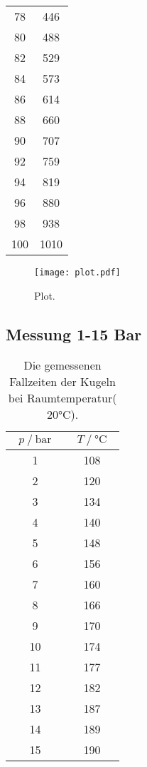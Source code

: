 \begin{table}
\begin{tabular}{cc}
      78 & 446 \\
      80 & 488 \\
      82 & 529 \\
      84 & 573 \\
      86 & 614 \\
      88 & 660 \\
      90 & 707 \\
      92 & 759 \\
      94 & 819 \\
      96 & 880 \\
      98 & 938 \\
      100 & 1010 \\
    \bottomrule
  \end{tabular}
  \label{tab:Tabelle1}
\end{table}
\begin{figure}[H]
  \centering
  \texttt{[image: plot.pdf]}
  \caption{Plot.}
  \label{fig:plot}
\end{figure}
\subsection{Messung 1-15 Bar}
\begin{table}
  \centering
  \caption{Die gemessenen Fallzeiten der Kugeln bei Raumtemperatur($20\unit{\celsius}$).}
  \begin{tabular}{cc}
    \toprule
    {$p \mathbin{/} \unit{\bar}$} &
    {$T \mathbin{/} \unit{\celsius}$} \\
    \midrule
      1 & 108 \\
      2 & 120 \\
      3 & 134 \\
      4 & 140 \\
      5 & 148 \\
      6 & 156 \\
      7 & 160 \\
      8 & 166 \\
      9 & 170 \\
      10 & 174 \\
      11 & 177 \\
      12 & 182 \\
      13 & 187 \\
      14 & 189 \\
      15 & 190 \\
    \bottomrule
  \end{tabular}
  \label{tab:Tabelle2}
\end{table}
